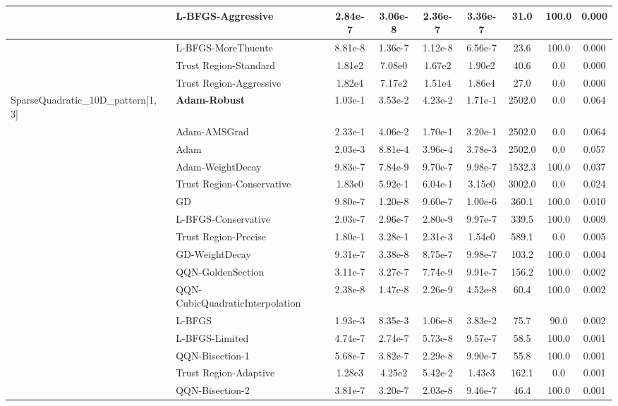 \documentclass{article}
\begin{document}
\begin{longtable}{|l|l|c|c|c|c|c|c|c|}
\hline
 & L-BFGS-Aggressive & 2.84e-7 & 3.06e-8 & 2.36e-7 & 3.36e-7 & 31.0 & 100.0 & 0.000 \\
\hline
 & L-BFGS-MoreThuente & 8.81e-8 & 1.36e-7 & 1.12e-8 & 6.56e-7 & 23.6 & 100.0 & 0.000 \\
\hline
 & Trust Region-Standard & 1.81e2 & 7.08e0 & 1.67e2 & 1.90e2 & 40.6 & 0.0 & 0.000 \\
\hline
 & Trust Region-Aggressive & 1.82e4 & 7.17e2 & 1.51e4 & 1.86e4 & 27.0 & 0.0 & 0.000 \\
SparseQuadratic\_10D\_pattern[1, 3] & \textbf{Adam-Robust} & 1.03e-1 & 3.53e-2 & 4.23e-2 & 1.71e-1 & 2502.0 & 0.0 & 0.064 \\
\hline
 & Adam-AMSGrad & 2.33e-1 & 4.06e-2 & 1.70e-1 & 3.20e-1 & 2502.0 & 0.0 & 0.064 \\
\hline
 & Adam & 2.03e-3 & 8.81e-4 & 3.96e-4 & 3.78e-3 & 2502.0 & 0.0 & 0.057 \\
\hline
 & Adam-WeightDecay & 9.83e-7 & 7.84e-9 & 9.70e-7 & 9.98e-7 & 1532.3 & 100.0 & 0.037 \\
\hline
 & Trust Region-Conservative & 1.83e0 & 5.92e-1 & 6.04e-1 & 3.15e0 & 3002.0 & 0.0 & 0.024 \\
\hline
 & GD & 9.80e-7 & 1.20e-8 & 9.60e-7 & 1.00e-6 & 360.1 & 100.0 & 0.010 \\
\hline
 & L-BFGS-Conservative & 2.03e-7 & 2.96e-7 & 2.80e-9 & 9.97e-7 & 339.5 & 100.0 & 0.009 \\
\hline
 & Trust Region-Precise & 1.80e-1 & 3.28e-1 & 2.31e-3 & 1.54e0 & 589.1 & 0.0 & 0.005 \\
\hline
 & GD-WeightDecay & 9.31e-7 & 3.38e-8 & 8.75e-7 & 9.98e-7 & 103.2 & 100.0 & 0.004 \\
\hline
 & QQN-GoldenSection & 3.11e-7 & 3.27e-7 & 7.74e-9 & 9.91e-7 & 156.2 & 100.0 & 0.002 \\
\hline
 & QQN-CubicQuadraticInterpolation & 2.38e-8 & 1.47e-8 & 2.26e-9 & 4.52e-8 & 60.4 & 100.0 & 0.002 \\
\hline
 & L-BFGS & 1.93e-3 & 8.35e-3 & 1.06e-8 & 3.83e-2 & 75.7 & 90.0 & 0.002 \\
\hline
 & L-BFGS-Limited & 4.74e-7 & 2.74e-7 & 5.73e-8 & 9.57e-7 & 58.5 & 100.0 & 0.001 \\
\hline
 & QQN-Bisection-1 & 5.68e-7 & 3.82e-7 & 2.29e-8 & 9.90e-7 & 55.8 & 100.0 & 0.001 \\
\hline
 & Trust Region-Adaptive & 1.28e3 & 4.25e2 & 5.42e-2 & 1.43e3 & 162.1 & 0.0 & 0.001 \\
\hline
 & QQN-Bisection-2 & 3.81e-7 & 3.20e-7 & 2.03e-8 & 9.46e-7 & 46.4 & 100.0 & 0.001 \\

\end{longtable}
\end{document}
